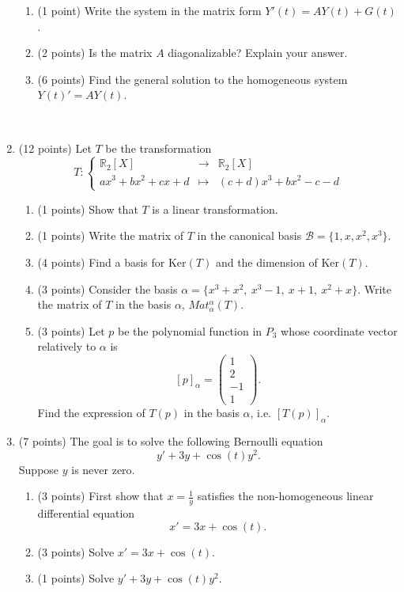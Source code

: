 \documentclass{article}
\begin{document}
\begin{enumerate}
\begin{enumerate}
\item (1 point) Write the system in the matrix form $Y'(t)= AY(t)+G(t)$.
\item (2 points) Is the matrix $A$ diagonalizable? Explain your answer.
\item (6 points) Find the general solution to the homogeneous system $Y(t)'= AY(t)$. 
\end{enumerate}

\newpage 
\
\newpage

\item (12 points) Let $T$ be the transformation
\[T: \left\{\begin{array}{rcl}
{\mathbb R}_2 [X] & \rightarrow & {\mathbb R}_2 [X] \\
ax^3+bx^2+cx+d &\mapsto & (c+d)x^3+bx^2 -c-d
\end{array}\right.\]
\begin{enumerate}
\item (1 points) Show that $T$ is a linear transformation.
\item (1 points) Write the matrix of $T$ in the canonical basis $\mathcal B = \{1,x,x^2, x^3\}$.
\item (4 points) Find a basis for $\text{Ker}(T)$ and the dimension of  $\text{Ker}(T)$.
\item (3 points) Consider the basis $\alpha = \lbrace x^3+x^2, \ x^3-1, \ x+1, \ x^2+x  \rbrace$. Write the matrix of $T$ in the basis $\alpha$, $Mat_\alpha^\alpha (T)$.
\item (3 points) Let $p$ be the polynomial function in $P_3$ whose coordinate vector relatively to $\alpha$ is 
\[ [p]_{\alpha}=\begin{pmatrix} 1\\ 2\\ -1\\ 1 \end{pmatrix}.\]
Find the expression of $T(p)$ in the basis $\alpha$, i.e. $[T(p)]_{\alpha}$.
\end{enumerate}

\newpage 

\item (7 points) The goal is to solve the following Bernoulli equation
\[y'+ 3y + \cos (t) y^2.\] 
Suppose $y$ is never zero.
\begin{enumerate}
\item (3 points) First show that $x= \frac{1}{y}$ satisfies the non-homogeneous linear differential equation \[x' = 3x + \cos(t).\] 
\item (3 points) Solve $x' = 3x + \cos(t)$.
\item (1 points) Solve $y'+ 3y + \cos (t) y^2$.
\end{enumerate}


\end{enumerate}
\end{document}
